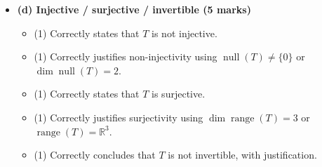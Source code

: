 \documentclass[12pt]{article}
\begin{document}
\begin{itemize}[leftmargin=1.6em]
  \item \textbf{(d) Injective / surjective / invertible (5 marks)}
  \begin{itemize}[leftmargin=1.6em]
    \item (1) Correctly states that $T$ is not injective.
    \item (1) Correctly justifies non-injectivity using $\operatorname{null}(T)\neq\{0\}$ or $\dim\operatorname{null}(T)=2$.
    \item (1) Correctly states that $T$ is surjective.
    \item (1) Correctly justifies surjectivity using $\dim\operatorname{range}(T)=3$ or $\operatorname{range}(T)=\mathbb{R}^3$.
    \item (1) Correctly concludes that $T$ is not invertible, with justification.
  \end{itemize}
\end{itemize}
\end{document}
